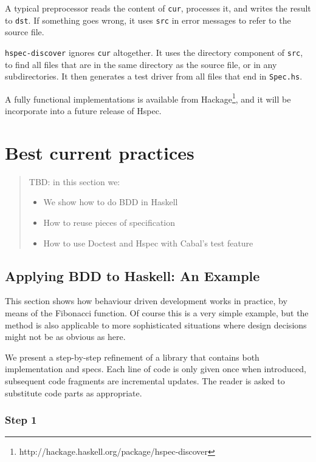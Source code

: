 \documentclass[preprint]{sigplanconf}
\begin{document}
\noindent A typical preprocessor reads the content of {\tt cur},
processes it, and writes the result to {\tt dst}.  If something goes
wrong, it uses {\tt src} in error messages to refer to the source
file.

\verb|hspec-discover| ignores {\tt cur} altogether.  It uses the
directory component of {\tt src}, to find all files that are in the
same directory as the source file, or in any subdirectories.  It then generates
a test driver from all files that end in {\tt Spec.hs}.

A fully functional implementations is available from
Hackage\footnote{http://hackage.haskell.org/package/hspec-discover},
and it will be incorporate into a future release of Hspec.

\section{Best current practices}
\label{sec:best-current-practice}

\begin{quote}
    TBD: in this section we:
    \begin{itemize}
        \item We show how to do BDD in Haskell
        \item How to reuse pieces of specification
        \item How to use Doctest and Hspec with Cabal's test feature
    \end{itemize}
\end{quote}

\subsection{Applying BDD to Haskell: An Example}
This section shows how behaviour driven development works in practice,
by means of the Fibonacci function.  Of course this is a very simple
example, but the method is also applicable to more sophisticated
situations where design decisions might not be as obvious as here.

We present a step-by-step refinement of a library
that contains both implementation and specs.  Each line of code is
only given once when introduced, subsequent code fragments are
incremental updates.  The reader is asked to substitute code parts as
appropriate.


\subsubsection{Step 1}
\end{document}
